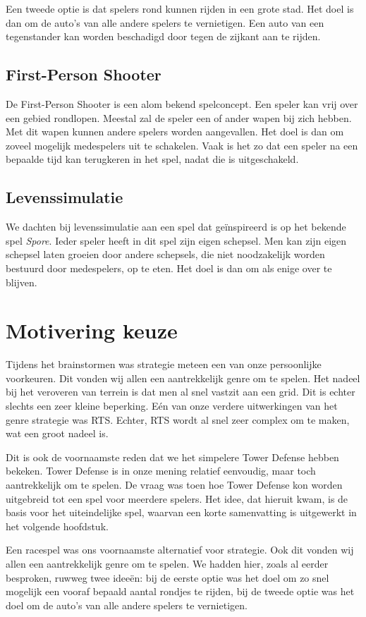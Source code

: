 Een tweede optie is dat spelers rond kunnen rijden in een grote stad. Het doel is dan om de auto's van alle andere spelers te vernietigen. Een auto van een tegenstander kan worden beschadigd door tegen de zijkant aan te rijden.

\subsection{First-Person Shooter}
De First-Person Shooter is een alom bekend spelconcept. Een speler kan vrij over een gebied rondlopen. Meestal zal de speler een of ander wapen bij zich hebben. Met dit wapen kunnen andere spelers worden aangevallen. Het doel is dan om zoveel mogelijk medespelers uit te schakelen. Vaak is het zo dat een speler na een bepaalde tijd kan terugkeren in het spel, nadat die is uitgeschakeld.

\subsection{Levenssimulatie}
We dachten bij levenssimulatie aan een spel dat ge\"inspireerd is op het bekende spel \emph{Spore}. Ieder speler heeft in dit spel zijn eigen schepsel. Men kan zijn eigen schepsel laten groeien door andere schepsels, die niet noodzakelijk worden bestuurd door medespelers, op te eten. Het doel is dan om als enige over te blijven.

\section{Motivering keuze}
Tijdens het brainstormen was strategie meteen een van onze persoonlijke voorkeuren. Dit vonden wij allen een aantrekkelijk genre om te spelen. Het nadeel bij het veroveren van terrein is dat men al snel vastzit aan een grid. Dit is echter slechts een zeer kleine beperking. E\'en van onze verdere uitwerkingen van het genre strategie was RTS. Echter, RTS wordt al snel zeer complex om te maken, wat een groot nadeel is.

Dit is ook de voornaamste reden dat we het simpelere Tower Defense hebben bekeken. Tower Defense is in onze mening relatief eenvoudig, maar toch aantrekkelijk om te spelen. De vraag was toen hoe Tower Defense kon worden uitgebreid tot een spel voor meerdere spelers. Het idee, dat hieruit kwam, is de basis voor het uiteindelijke spel, waarvan een korte samenvatting is uitgewerkt in het volgende hoofdstuk.

Een racespel was ons voornaamste alternatief voor strategie. Ook dit vonden wij allen een aantrekkelijk genre om te spelen. We hadden hier, zoals al eerder besproken, ruwweg twee idee\"en: bij de eerste optie was het doel om zo snel mogelijk een vooraf bepaald aantal rondjes te rijden, bij de tweede optie was het doel om de auto's van alle andere spelers te vernietigen.

